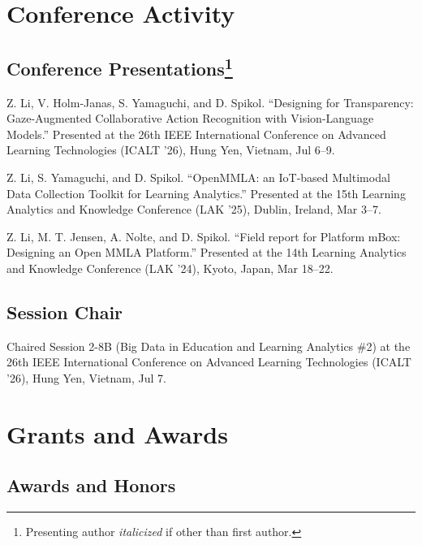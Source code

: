 \documentclass[11pt,letterpaper]{report}
\begin{document}
    \section*{Conference Activity}

    \subsection*{Conference Presentations\footnote{Presenting author \textit{italicized} if other than first author.}}

    \begin{tablist}
        \item[2026] \tab{} Z. Li, V. Holm-Janas, S. Yamaguchi, and D. Spikol. \enquote{Designing for Transparency: Gaze-Augmented Collaborative Action Recognition with Vision-Language Models.} Presented at the 26th IEEE International Conference on Advanced Learning Technologies (ICALT '26), Hung Yen, Vietnam, Jul 6--9.
        \item[2025] \tab{} Z. Li, S. Yamaguchi, and D. Spikol. \enquote{OpenMMLA: an IoT-based Multimodal Data Collection Toolkit for Learning Analytics.} Presented at the 15th Learning Analytics and Knowledge Conference (LAK '25), Dublin, Ireland, Mar 3--7.
        \item[2024] \tab{} Z. Li, M. T. Jensen, A. Nolte, and D. Spikol. \enquote{Field report for Platform mBox: Designing an Open MMLA Platform.} Presented at the 14th Learning Analytics and Knowledge Conference (LAK '24), Kyoto, Japan, Mar 18--22.
    \end{tablist}

    \subsection*{Session Chair}

    \begin{tablist}
        \item[2026] \tab{} Chaired Session 2-8B (Big Data in Education and Learning Analytics \#2) at the 26th IEEE International Conference on Advanced Learning Technologies (ICALT '26), Hung Yen, Vietnam, Jul 7.
    \end{tablist}

    \section*{Grants and Awards}

    \subsection*{Awards and Honors}
\end{document}
